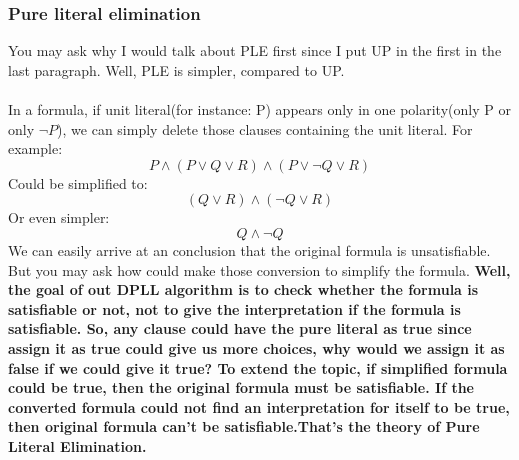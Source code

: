 \documentclass{article}
\begin{document}
\subsubsection{Pure literal elimination}
You may ask why I would talk about PLE first since I put UP in the first in the last paragraph. Well, PLE is simpler, compared to UP.\\\\
In a formula, if unit literal(for instance: P) appears only in one polarity(only P or only $\neg P$), we can simply delete those clauses containing the unit literal. For example:
$$P \land (P \lor Q \lor R) \land (P \lor \neg Q \lor R)$$
Could be simplified to:
$$(Q \lor R) \land (\neg Q \lor R)$$
Or even simpler:
$$Q \land \neg Q$$
We can easily arrive at an conclusion that the original formula is unsatisfiable. But you may ask how could make those conversion to simplify the formula. \textbf{Well, the goal of out DPLL algorithm is to check whether the formula is satisfiable or not, not to give the interpretation if the formula is satisfiable. So, any clause could have the pure literal as true since assign it as true could give us more choices, why would we assign it as false if we could give it true? To extend the topic, if simplified formula could be true, then the original formula must be satisfiable. If the converted formula could not find an interpretation for itself to be true, then original formula can't be satisfiable.That's the theory of Pure Literal Elimination.}\\\\
\end{document}

